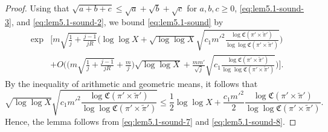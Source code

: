 \documentclass[12pt,reqno]{amsart}
\theoremstyle{remark}
\numberwithin{equation}{section}
\begin{document}
\begin{proof}
    Using that $\sqrt{a+b+c}\leq \sqrt{a}+\sqrt{b}+\sqrt{c}$ for $a,b,c \geq 0$,  \eqref{eq:lem5.1-sound-3}, and \eqref{eq:lem5.1-sound-2}, we bound \eqref{eq:lem5.1-sound} by
	\begin{equation}\label{eq:lem5.1-sound-7}
        \begin{aligned}
        \exp &\Bigg[m \sqrt{\frac{1}{j}+\frac{j-1}{jR}}\Bigg(\log\log X + 
        \sqrt{\log\log X}\sqrt{c_1 {m'}^2\frac{\log\mathfrak{C}(\pi' \times \widetilde{\pi}')}{\log\log\mathfrak{C}(\pi' \times \widetilde{\pi}')}}\Bigg) \\ 
        & +O\Bigg( \Bigg(m\sqrt{\frac{1}{j}+\frac{j-1}{jR}}+ \frac{m}{j}\Bigg)\sqrt{\log\log X} + \frac{mm'}{\sqrt{j}}\sqrt{c_1 \frac{\log\mathfrak{C}(\pi' \times \widetilde{\pi}')}{\log\log\mathfrak{C}(\pi' \times \widetilde{\pi}')}}\Bigg)\Bigg].
        \end{aligned}
    \end{equation} 
    By the inequality of arithmetic and geometric means, it follows that
    \begin{equation}
    \label{eq:lem5.1-sound-8}
    \sqrt{\log\log X}\sqrt{c_1 m'^2 \frac{\log\mathfrak{C}(\pi' \times \widetilde{\pi}')}{\log\log\mathfrak{C}(\pi' \times \widetilde{\pi}')}} \le \frac{1}{2}\log\log X + \frac{c_1m'^2}{2} \frac{\log\mathfrak{C}(\pi' \times \widetilde{\pi}')}{\log\log\mathfrak{C}(\pi' \times \widetilde{\pi}')}.
    \end{equation}
    Hence, the lemma follows from \eqref{eq:lem5.1-sound-7} and \eqref{eq:lem5.1-sound-8}.
    \end{proof}
\end{document}
